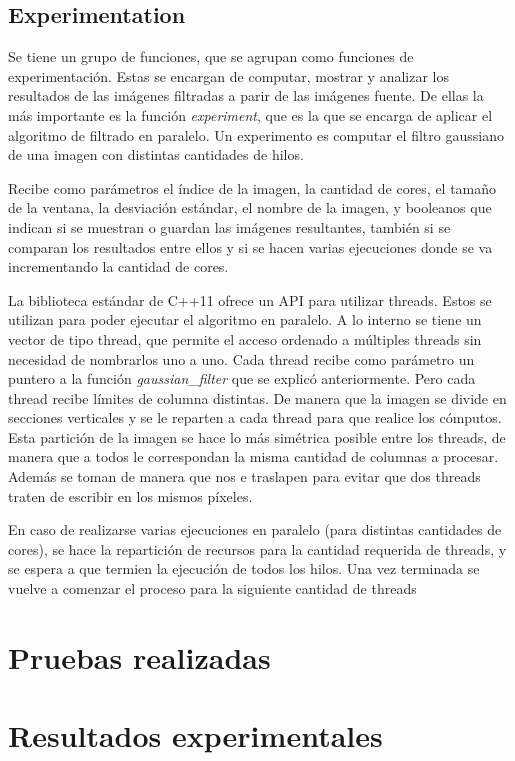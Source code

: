 \documentclass {article}
\begin{document}
\subsection{Experimentation}

Se tiene un grupo de funciones, que se agrupan como funciones de experimentación. Estas se encargan
de computar, mostrar y analizar los resultados de las imágenes filtradas a parir de las imágenes
fuente. De ellas la más importante es la función \textit{experiment}, que es la que se encarga de
aplicar el algoritmo de filtrado en paralelo. Un experimento es computar el filtro gaussiano de una
imagen con distintas cantidades de hilos. 

Recibe como parámetros el índice de la imagen, la
cantidad de cores, el tamaño de la ventana, la desviación estándar, el nombre de la imagen, y
booleanos que indican si se muestran o guardan las imágenes resultantes, también si se comparan los
resultados entre ellos y si se hacen varias ejecuciones donde se va incrementando la cantidad de
cores.

La biblioteca estándar de C++11 ofrece un API para utilizar threads. Estos se utilizan para poder
ejecutar el algoritmo en paralelo. A lo interno se tiene un vector de tipo thread, que permite
el acceso ordenado a múltiples threads sin necesidad de nombrarlos uno a uno. Cada
thread recibe como parámetro un puntero a la función \textit{gaussian\_filter} que se explicó
anteriormente. Pero cada thread recibe límites de columna distintas. De manera que la imagen se
divide en secciones verticales y se le reparten a cada thread para que realice los cómputos. Esta
partición de la imagen se hace lo más simétrica posible entre los threads, de manera que a todos le
correspondan la misma cantidad de columnas a procesar. Además se toman de manera que nos e traslapen
para evitar que dos threads traten de escribir en los mismos píxeles.

En caso de realizarse varias ejecuciones en paralelo (para distintas cantidades de cores), se hace
la repartición de recursos para la cantidad requerida de threads, y se espera a que termien la
ejecución de todos los hilos. Una vez terminada se vuelve a comenzar el proceso para la siguiente
cantidad de threads


\section{Pruebas realizadas}

\section{Resultados experimentales}
\end{document}
